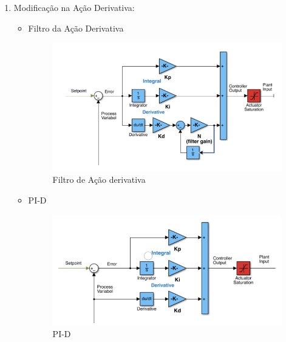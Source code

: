 \begin{enumerate}
        \begin{enumerate}
            \item Modificação na Ação Derivativa:
                \begin{itemize}
                    \item Filtro da Ação Derivativa
                        \begin{figure}[h]
                            \centering
                            \includegraphics[width=15cm]{images/roteiro a/img ref teorico/filtro_de_acao_derivativa.png}
                            \caption{Filtro de Ação derivativa}
                            \label{fig:filtro_de_acao_derivativa}
                        \end{figure}
                    \item PI-D
                        \begin{figure}[h]
                            \centering
                            \includegraphics[width=15cm]{images/roteiro a/img ref teorico/pid.png}
                            \caption{PI-D}
                            \label{fig:pid}
                        \end{figure}
                        \begin{itemize}

\end{itemize}
\end{itemize}
\end{enumerate}
\end{enumerate}
